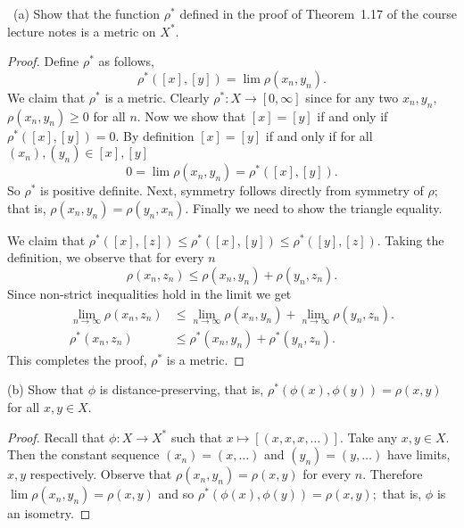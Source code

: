 \documentclass[11pt]{amsart}
\begin{document}
\medskip {}\ 
(a) Show that the function $\rho^*$ defined in the proof of Theorem~1.17 of the
course lecture notes is a metric on $X^*$. 
\begin{proof}
	Define $\rho^*$ as follows,
	\begin{equation*}
		\rho^*([x], [y]) = \lim \rho(x_n, y_n).
	\end{equation*}
	We claim that $\rho^*$ is a metric. Clearly $\rho^*: X \to [0, \infty]$ since for any two $x_n, y_n$, $\rho(x_n,y_n) \geq 0$ for all $n$. Now we show that $[x] = [y]$ if and only if $\rho^*([x], [y]) = 0.$ By definition $[x] = [y]$ if and only if for all $(x_n), (y_n) \in [x], [y]$ 
	\begin{equation*}
		0 = \lim \rho(x_n, y_n)  = \rho^*([x],[y]).
	\end{equation*}
	So $\rho^*$ is positive definite. Next, symmetry follows directly from symmetry of $\rho;$ that is, $\rho(x_n, y_n) = \rho(y_n, x_n).$  Finally we need to show the triangle equality.

	We claim that $\rho^*([x],[z]) \leq \rho^*([x], [y]) \leq \rho^*([y], [z]).$ Taking the definition, we observe that for every $n$
	\begin{equation*}
		\rho(x_n, z_n) \leq \rho(x_n, y_n) + \rho(y_n, z_n).
	\end{equation*}
	Since  non-strict inequalities hold in the limit we get
	\begin{equation*}
		\begin{aligned}
			\lim_{n\to\infty}\rho(x_n, z_n) &\leq \lim_{n\to\infty}\rho(x_n, y_n) + \lim_{n\to\infty}\rho(y_n, z_n).\\
			\rho^*(x_n, z_n) &\leq \rho^*(x_n, y_n) + \rho^*(y_n, z_n). 
		\end{aligned}
	\end{equation*}
	This completes the proof, $\rho^*$ is a metric.
\end{proof}

 (b) Show that $\phi$ is distance-preserving,
that is, $\rho^*(\phi(x),\phi(y))=\rho(x,y)$ for all $x,y\in X$.
\begin{proof}
	Recall that $\phi: X \to X^*$ such that $x \mapsto [(x,x,x,\dots)]$. Take any $x, y \in X$. Then the constant sequence $(x_n) =(x, \dots)$ and $ (y_n) = (y, \dots)$ have limits, $x, y$ respectively. Observe that $\rho(x_n, y_n) = \rho(x,y)$ for every $n$. Therefore $\lim \rho(x_n, y_n) = \rho(x,y)$ and so $\rho^{*}(\phi(x), \phi(y)) = \rho(x,y);$ that is, $\phi$ is an isometry.
\end{proof}
\end{document}
